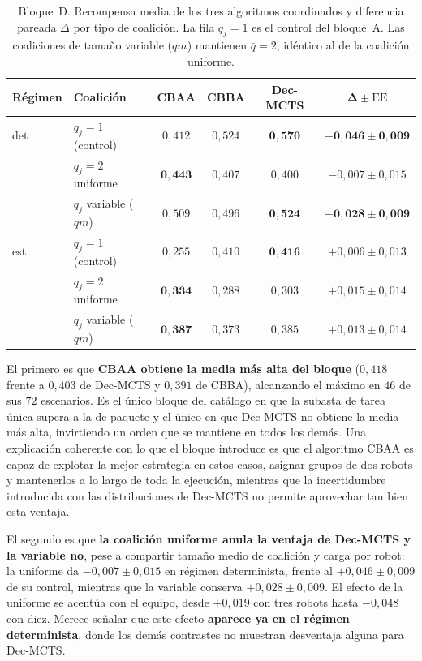 \begin{table}[t]
\centering
\caption{Bloque~D. Recompensa media de los tres algoritmos coordinados y diferencia pareada $\Delta$ por tipo de coalición. La fila $q_j=1$ es el control del bloque~A. Las coaliciones de tamaño variable ($qm$) mantienen $\bar q=2$, idéntico al de la coalición uniforme.}
\label{tab:res-coaliciones}
\small
\begin{tabular}{llccc c}
\hline
\textbf{Régimen} & \textbf{Coalición} & \textbf{CBAA} & \textbf{CBBA} & \textbf{Dec-MCTS} & $\boldsymbol{\Delta \pm \mathrm{EE}}$ \\
\hline
det & $q_j=1$ (control)     & $0{,}412$ & $0{,}524$ & $\mathbf{0{,}570}$ & $\mathbf{+0{,}046 \pm 0{,}009}$ \\
    & $q_j=2$ uniforme      & $\mathbf{0{,}443}$ & $0{,}407$ & $0{,}400$ & $-0{,}007 \pm 0{,}015$ \\
    & $q_j$ variable ($qm$) & $0{,}509$ & $0{,}496$ & $\mathbf{0{,}524}$ & $\mathbf{+0{,}028 \pm 0{,}009}$ \\
\hline
est & $q_j=1$ (control)     & $0{,}255$ & $0{,}410$ & $\mathbf{0{,}416}$ & $+0{,}006 \pm 0{,}013$ \\
    & $q_j=2$ uniforme      & $\mathbf{0{,}334}$ & $0{,}288$ & $0{,}303$ & $+0{,}015 \pm 0{,}014$ \\
    & $q_j$ variable ($qm$) & $\mathbf{0{,}387}$ & $0{,}373$ & $0{,}385$ & $+0{,}013 \pm 0{,}014$ \\
\hline
\end{tabular}
\end{table}

El primero es que \textbf{CBAA obtiene la media más alta del bloque} ($0{,}418$ frente a $0{,}403$ de Dec-MCTS y $0{,}391$ de CBBA), alcanzando el máximo en $46$ de sus $72$ escenarios. Es el único bloque del catálogo en que la subasta de tarea única supera a la de paquete y el único en que Dec-MCTS no obtiene la media más alta, invirtiendo un orden que se mantiene en todos los demás. Una explicación coherente con lo que el bloque introduce es que el algoritmo CBAA es capaz de explotar la mejor estrategia en estos casos, asignar grupos de dos robots y mantenerlos a lo largo de toda la ejecución, mientras que la incertidumbre introducida con las distribuciones de Dec-MCTS no permite aprovechar tan bien esta ventaja.

El segundo es que \textbf{la coalición uniforme anula la ventaja de Dec-MCTS y la variable no}, pese a compartir tamaño medio de coalición y carga por robot: la uniforme da $-0{,}007 \pm 0{,}015$ en régimen determinista, frente al $+0{,}046 \pm 0{,}009$ de su control, mientras que la variable conserva $+0{,}028 \pm 0{,}009$. El efecto de la uniforme se acentúa con el equipo, desde $+0{,}019$ con tres robots hasta $-0{,}048$ con diez. Merece señalar que este efecto \textbf{aparece ya en el régimen determinista}, donde los demás contrastes no muestran desventaja alguna para Dec-MCTS.

